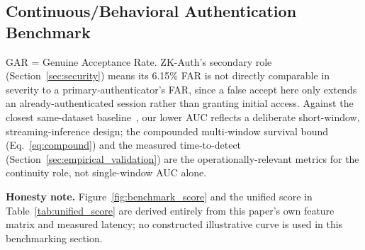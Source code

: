 \documentclass[journal,twoside,10pt]{IEEEtran}
\begin{document}
\subsection{Continuous/Behavioral Authentication Benchmark}
\begin{table}[!t]
\renewcommand{\arraystretch}{1.2}
\caption{Continuous Authentication Benchmark. ZK-Auth figures measured on
the Balabit test split; other figures are literature-reported on their
own respective evaluation sets --- \textbf{not} a like-for-like dataset
comparison.}
\label{tab:benchmark_behavioral}
\centering
{}
\end{table}
GAR = Genuine Acceptance Rate. ZK-Auth's secondary role (Section~\ref{sec:security})
means its 6.15\% FAR is not directly comparable in severity to a
primary-authenticator's FAR, since a false accept here only extends an
already-authenticated session rather than granting initial access. Against
the closest same-dataset baseline~\cite{antal19}, our lower AUC reflects a
deliberate short-window, streaming-inference design; the compounded
multi-window survival bound (Eq.~\ref{eq:compound}) and the measured
time-to-detect (Section~\ref{sec:empirical_validation}) are the
operationally-relevant metrics for the continuity role, not single-window
AUC alone.

\textbf{Honesty note.} Figure~\ref{fig:benchmark_score} and the unified
score in Table~\ref{tab:unified_score} are derived entirely from this
paper's own feature matrix and measured latency; no constructed
illustrative curve is used in this benchmarking section.

\end{document}
